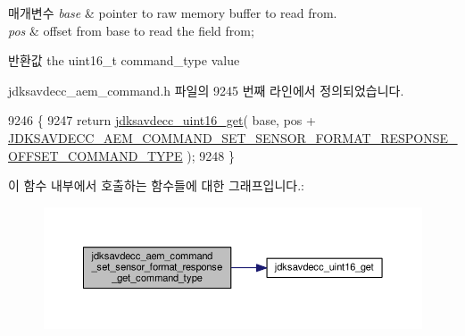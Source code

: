 \begin{DoxyParams}{매개변수}
{\em base} & pointer to raw memory buffer to read from. \\
\hline
{\em pos} & offset from base to read the field from; \\
\hline
\end{DoxyParams}
\begin{DoxyReturn}{반환값}
the uint16\+\_\+t command\+\_\+type value 
\end{DoxyReturn}


jdksavdecc\+\_\+aem\+\_\+command.\+h 파일의 9245 번째 라인에서 정의되었습니다.


\begin{DoxyCode}
9246 \{
9247     \textcolor{keywordflow}{return} \hyperlink{group__endian_ga3fbbbc20be954aa61e039872965b0dc9}{jdksavdecc\_uint16\_get}( base, pos + 
      \hyperlink{group__command__set__sensor__format__response_ga2e0d6e35a1738a777db991f0492426f8}{JDKSAVDECC\_AEM\_COMMAND\_SET\_SENSOR\_FORMAT\_RESPONSE\_OFFSET\_COMMAND\_TYPE}
       );
9248 \}
\end{DoxyCode}


이 함수 내부에서 호출하는 함수들에 대한 그래프입니다.\+:
\nopagebreak
\begin{figure}[H]
\begin{center}
\leavevmode
\includegraphics[width=350pt]{group__command__set__sensor__format__response_ga80929e320610830317fa293a47341116_cgraph}
\end{center}
\end{figure}


